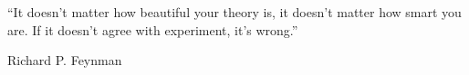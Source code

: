 \documentclass[12pt,a4paper]{book}
\begin{document}
\frontmatter




\thispagestyle{empty}

\vspace*{\fill}

\epigraph{
    ``It doesn't matter how beautiful your theory is, it doesn't matter how smart you are. If it doesn't agree with experiment, it's wrong.''
}{
    Richard P. Feynman
}

\vspace*{\fill}





\tableofcontents


\mainmatter





\end{document}
